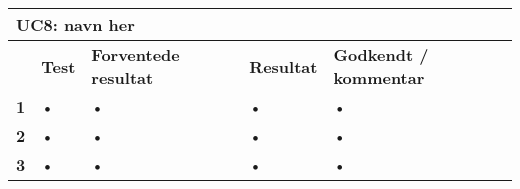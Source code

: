 
\begin{longtable}{|p{5mm}|p{40mm}|p{40mm}|p{20mm}|p{25mm}|}
\hline 
\multicolumn{5}{|l|}{\textbf{UC8: navn her}} \\ 
\hline 
& \textbf{Test}&\textbf{Forventede resultat}& \textbf{Resultat} & \textbf{Godkendt / kommentar} \\ 
\hline 
\textbf{1}& • & • & • & • \\ 
\hline 
\textbf{2}& • & • & • & • \\ 
\hline 
\textbf{3}& • & • & • & • \\ 
\hline  
\end{longtable} 